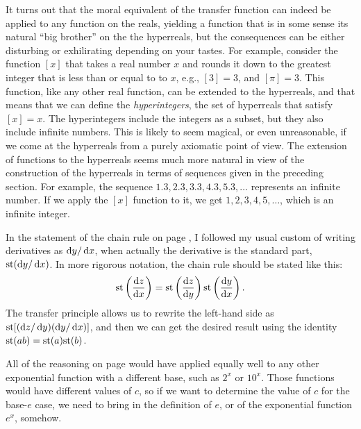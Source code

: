 It turns out that the moral equivalent of the  transfer function can indeed be applied to any function on
the reals, yielding a function that is in some sense its natural ``big brother'' on the the hyperreals, but the consequences can be
either disturbing or exhilirating depending on your tastes.
 For example, consider the function $[x]$ that takes
a real number $x$ and rounds it down to the greatest integer that is less than or equal to to $x$, e.g.,
$[3]=3$, and $[\pi]=3$. This function, like any other real function,
can be extended to the hyperreals, and that means that we can define
the \emph{hyperintegers},
the set of hyperreals that satisfy $[x]=x$. The hyperintegers include the integers as a subset,
but they also include infinite numbers. This is likely to seem magical, or even unreasonable, if we come
at the hyperreals from a purely axiomatic point of view.
The extension of functions to the hyperreals seems much more natural in view of the
construction of the hyperreals in terms of sequences given in the preceding section. For example,
the sequence $1.3, 2.3, 3.3, 4.3, 5.3, \ldots$ represents an infinite number. If we apply the $[x]$
function to it, we get $1, 2, 3, 4, 5, \ldots$, which is an infinite integer.


In the statement of the chain rule on page \pageref{sec:chain-rule}, I followed my usual custom of writing
derivatives as $\operatorname{d\!} y/\operatorname{d\!} x$, when actually the derivative is the standard part, $\textup{st}(\operatorname{d\!} y/\operatorname{d\!} x)$. In more rigorous
notation, the chain rule should be stated like this:
\begin{equation*}
  \textup{st}\left(\frac{\operatorname{d\!} z}{\operatorname{d\!} x}\right) =   \textup{st}\left(\frac{\operatorname{d\!} z}{\operatorname{d\!} y}\right) \textup{st}\left(\frac{\operatorname{d\!} y}{\operatorname{d\!} x}\right).
\end{equation*}
The transfer principle allows us to rewrite the left-hand side as $\textup{st}[(\operatorname{d\!} z/\operatorname{d\!} y)(\operatorname{d\!} y/\operatorname{d\!} x)]$, and then
we can get the desired result using the identity $\textup{st}(ab)=\textup{st}(a)\textup{st}(b)$.


All of the reasoning on page \pageref{main:exp} would have applied equally well to any other
exponential function with a different base, such as $2^x$ or $10^x$. Those functions would have
different values of $c$, so if we want to determine the value of $c$ for the base-$e$ case, we
need to bring in the definition of $e$, or of the exponential function $e^x$, somehow.

